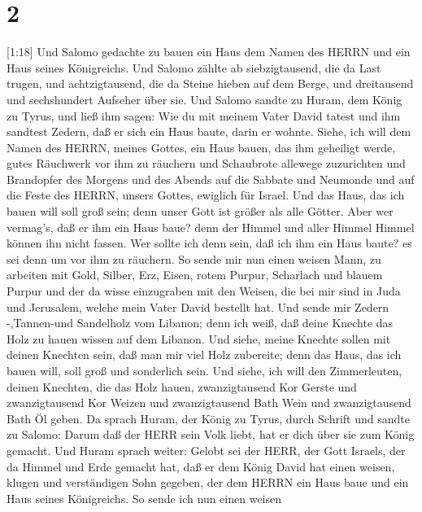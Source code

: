 \hypertarget{section-1}{%
\section{2}\label{section-1}}

 {[}1:18{]} Und Salomo gedachte zu bauen ein Haus dem Namen
des HERRN und ein Haus seines Königreichs.  Und Salomo
zählte ab siebzigtausend, die da Last trugen, und achtzigtausend, die da
Steine hieben auf dem Berge, und dreitausend und sechshundert Aufseher
über sie.  Und Salomo sandte zu Huram, dem König zu Tyrus,
und ließ ihm sagen: Wie du mit meinem Vater David tatest und ihm
sandtest Zedern, daß er sich ein Haus baute, darin er wohnte.
 Siehe, ich will dem Namen des HERRN, meines Gottes, ein
Haus bauen, das ihm geheiligt werde, gutes Räuchwerk vor ihm zu räuchern
und Schaubrote allewege zuzurichten und Brandopfer des Morgens und des
Abends auf die Sabbate und Neumonde und auf die Feste des HERRN, unsers
Gottes, ewiglich für Israel.  Und das Haus, das ich bauen
will soll groß sein; denn unser Gott ist größer als alle Götter.
 Aber wer vermag's, daß er ihm ein Haus baue? denn der
Himmel und aller Himmel Himmel können ihn nicht fassen. Wer sollte ich
denn sein, daß ich ihm ein Haus baute? es sei denn um vor ihm zu
räuchern.  So sende mir nun einen weisen Mann, zu arbeiten
mit Gold, Silber, Erz, Eisen, rotem Purpur, Scharlach und blauem Purpur
und der da wisse einzugraben mit den Weisen, die bei mir sind in Juda
und Jerusalem, welche mein Vater David bestellt hat.  Und
sende mir Zedern -,Tannen-und Sandelholz vom Libanon; denn ich weiß, daß
deine Knechte das Holz zu hauen wissen auf dem Libanon. Und siehe, meine
Knechte sollen mit deinen Knechten sein,  daß man mir viel
Holz zubereite; denn das Haus, das ich bauen will, soll groß und
sonderlich sein.  Und siehe, ich will den Zimmerleuten,
deinen Knechten, die das Holz hauen, zwanzigtausend Kor Gerste und
zwanzigtausend Kor Weizen und zwanzigtausend Bath Wein und
zwanzigtausend Bath Öl geben.  Da sprach Huram, der König
zu Tyrus, durch Schrift und sandte zu Salomo: Darum daß der HERR sein
Volk liebt, hat er dich über sie zum König gemacht.  Und
Huram sprach weiter: Gelobt sei der HERR, der Gott Israels, der da
Himmel und Erde gemacht hat, daß er dem König David hat einen weisen,
klugen und verständigen Sohn gegeben, der dem HERRN ein Haus baue und
ein Haus seines Königreichs.  So sende ich nun einen weisen
